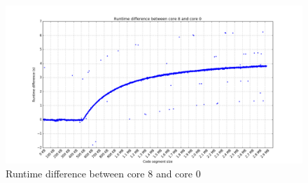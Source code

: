 \documentclass[a4paper]{jpconf}
\begin{document}
\begin{figure}[h]
\begin{center}
\includegraphics[scale=0.45]{images/runtime_difference.png}
\end{center}
\caption{\label{fig:runtime-difference} Runtime difference between core 8 and core 0}
\end{figure}


\end{document}
